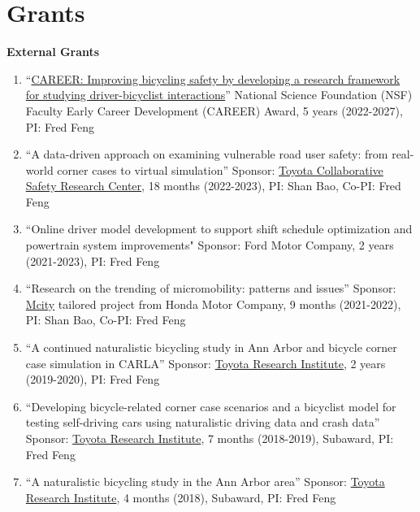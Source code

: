 \documentclass[11pt]{article}
\newenvironment{main}
{\begin{adjustwidth}{3em}{}}
{\end{adjustwidth}}
\begin{document}
\section*{Grants}
\begin{main}


\textbf{External Grants}

\begin{enumerate}
    \item ``\href{https://www.nsf.gov/awardsearch/showAward?AWD_ID=2142757}{CAREER: Improving bicycling safety by developing a research framework for studying driver-bicyclist interactions}''
        National Science Foundation (NSF) Faculty Early Career Development (CAREER) Award, 5 years (2022-2027), PI: Fred Feng
    \item ``A data-driven approach on examining vulnerable road user safety: from real-world corner cases to virtual simulation'' 
         Sponsor: \href{https://amrd.toyota.com/division/csrc/}{Toyota Collaborative Safety Research Center}, 18 months (2022-2023), PI: Shan Bao, Co-PI: Fred Feng
    \item ``Online driver model development to support shift schedule optimization and powertrain system improvements"
        Sponsor: Ford Motor Company, 2 years (2021-2023), PI: Fred Feng
    \item ``Research on the trending of micromobility: patterns and issues''
        Sponsor: \href{https://mcity.umich.edu/}{Mcity} tailored project from Honda Motor Company, 9 months (2021-2022), PI: Shan Bao, Co-PI: Fred Feng
    \item ``A continued naturalistic bicycling study in Ann Arbor and bicycle corner case simulation in CARLA''
        Sponsor: \href{https://www.tri.global/}{Toyota Research Institute}, 2 years (2019-2020), PI: Fred Feng
    \item ``Developing bicycle-related corner case scenarios and a bicyclist model for testing self-driving cars using naturalistic driving data and crash data''
        Sponsor: \href{https://www.tri.global/}{Toyota Research Institute}, 7 months (2018-2019), Subaward, PI: Fred Feng
    \item ``A naturalistic bicycling study in the Ann Arbor area''
        Sponsor: \href{https://www.tri.global/}{Toyota Research Institute}, 4 months (2018), Subaward, PI: Fred Feng

    \end{enumerate}


\end{main}
\end{document}
